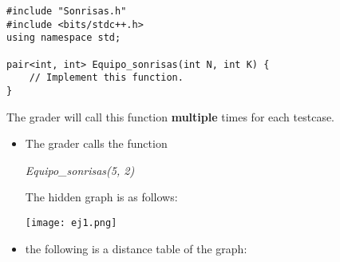 \documentclass[12pt]{scrartcl}
\begin{document}
\begin{verbatim}
#include "Sonrisas.h"
#include <bits/stdc++.h>
using namespace std;

pair<int, int> Equipo_sonrisas(int N, int K) {
    // Implement this function.
}

\end{verbatim}

    The grader will call this function \textbf{multiple} times for each testcase.
    

        \begin{itemize}
            \item The grader calls the function 
            \begin{center}
                \textit{Equipo\_sonrisas(5, 2)}
            \end{center}
            The hidden graph is as follows:
            \begin{center}
                \texttt{[image: ej1.png]}
            \end{center}
            \item the following is a distance table of the graph:
            

\end{itemize}
\end{document}
